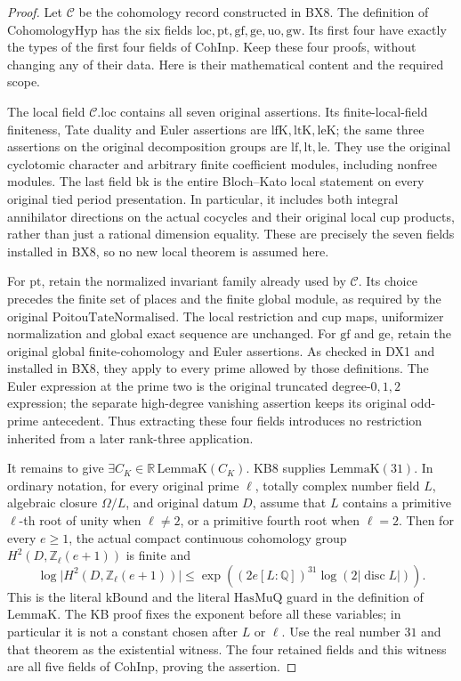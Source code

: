 \documentclass[11pt,a4paper]{article}
\numberwithin{equation}{section}
\theoremstyle{remark}\newtheorem{remark}[theorem]{Remark}
\begin{document}
\begin{proof}
Let \(\mathcal C\) be the cohomology record constructed in BX8.
The definition of \(\mathrm{CohomologyHyp}\) has the six fields
\(\mathrm{loc},\mathrm{pt},\mathrm{gf},\mathrm{ge},
\mathrm{uo},\mathrm{gw}\).  Its first four have exactly the
types of the first four fields of \(\mathrm{CohInp}\).
Keep these four proofs, without changing any of their data.
Here is their mathematical content and the required scope.

The local field \(\mathcal C.\mathrm{loc}\) contains all seven
original assertions.  Its finite-local-field finiteness, Tate
duality and Euler assertions are \(\mathrm{lfK},\mathrm{ltK},
\mathrm{leK}\); the same three assertions on the original
decomposition groups are \(\mathrm{lf},\mathrm{lt},\mathrm{le}\).
They use the original cyclotomic character and arbitrary finite
coefficient modules, including nonfree modules.  The last field
\(\mathrm{bk}\) is the entire Bloch--Kato local statement on
every original tied period presentation.  In particular, it includes
both integral annihilator directions on the actual cocycles and
their original local cup products, rather than just a rational
dimension equality.  These are precisely the seven fields installed
in BX8, so no new local theorem is assumed here.

For \(\mathrm{pt}\), retain the normalized invariant family
already used by \(\mathcal C\).  Its choice precedes the finite
set of places and the finite global module, as required by the
original \(\mathrm{PoitouTateNormalised}\).  The local restriction
and cup maps, uniformizer normalization and global exact sequence
are unchanged.  For \(\mathrm{gf}\) and \(\mathrm{ge}\), retain
the original global finite-cohomology and Euler assertions.  As
checked in DX1 and installed in BX8, they apply to every prime
allowed by those definitions.  The Euler expression at the prime
two is the original truncated degree-\(0,1,2\) expression; the
separate high-degree vanishing assertion keeps its original
odd-prime antecedent.  Thus extracting these four fields introduces
no restriction inherited from a later rank-three application.

It remains to give \(\exists C_K\in\mathbb R\,
\mathrm{LemmaK}(C_K)\).  KB8 supplies \(\mathrm{LemmaK}(31)\).
In ordinary notation, for every original prime \(\ell\), totally
complex number field \(L\), algebraic closure \(\Omega/L\),
and original datum \(D\), assume that \(L\) contains a primitive
\(\ell\)-th root of unity when \(\ell\ne2\), or a primitive
fourth root when \(\ell=2\).  Then for every \(e\ge1\), the
actual compact continuous cohomology group
\(H^2(D,\mathbb Z_\ell(e+1))\) is finite and
\[
 \log\bigl|H^2(D,\mathbb Z_\ell(e+1))\bigr|
 \le
 \exp\!\left((2e[L:\mathbb Q])^{31}
                    \log(2|\operatorname{disc}L|)\right).
 \tag{KIZ.1}
\]
This is the literal \(\mathrm{kBound}\) and the literal
\(\mathrm{HasMuQ}\) guard in the definition of \(\mathrm{LemmaK}\).
The KB proof fixes the exponent before all these variables; in
particular it is not a constant chosen after \(L\) or \(\ell\).
Use the real number \(31\) and that theorem as the existential
witness.  The four retained fields and this witness are all five
fields of \(\mathrm{CohInp}\), proving the assertion.
\end{proof}
\end{document}
